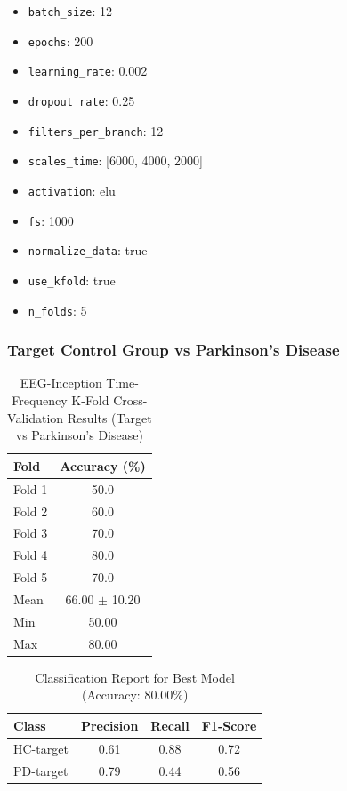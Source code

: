 \documentclass[12pt]{report}
\begin{document}
\begin{itemize}
    \item \texttt{batch\_size}: 12
    \item \texttt{epochs}: 200
    \item \texttt{learning\_rate}: 0.002
    \item \texttt{dropout\_rate}: 0.25
    \item \texttt{filters\_per\_branch}: 12
    \item \texttt{scales\_time}: [6000, 4000, 2000]
    \item \texttt{activation}: elu
    \item \texttt{fs}: 1000
    \item \texttt{normalize\_data}: true
    \item \texttt{use\_kfold}: true
    \item \texttt{n\_folds}: 5
\end{itemize}

\subsubsection{Target Control Group vs Parkinson's Disease}

\begin{table}[h]
\centering
\caption{EEG-Inception Time-Frequency K-Fold Cross-Validation Results (Target vs Parkinson's Disease)}
\begin{tabular}{lc}
\hline
\textbf{Fold} & \textbf{Accuracy (\%)} \\
\hline
Fold 1 & 50.0 \\
Fold 2 & 60.0 \\
Fold 3 & 70.0 \\
Fold 4 & 80.0 \\
Fold 5 & 70.0 \\
\hline
Mean & 66.00 $\pm$ 10.20 \\
Min & 50.00 \\
Max & 80.00 \\
\hline
\end{tabular}
\end{table}

\begin{table}[h]
\centering
\caption{Classification Report for Best Model (Accuracy: 80.00\%)}
\begin{tabular}{lccc}
\hline
\textbf{Class} & \textbf{Precision} & \textbf{Recall} & \textbf{F1-Score} \\
\hline
HC-target & 0.61 & 0.88 & 0.72 \\
PD-target & 0.79 & 0.44 & 0.56 \\
\hline
\end{tabular}
\end{table}
\end{document}
